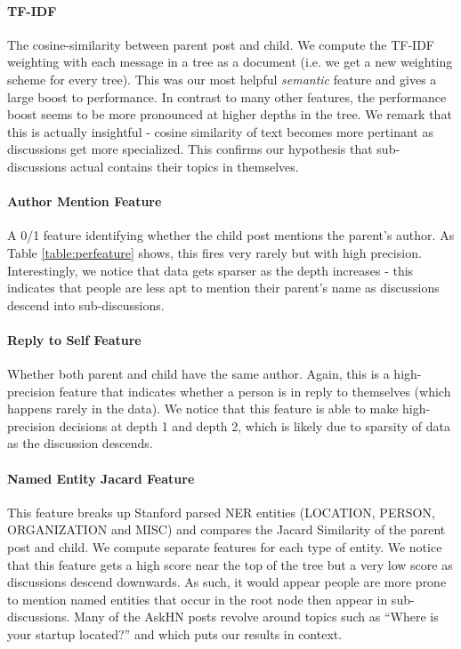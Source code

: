 \documentclass{article}
\begin{document}
\paragraph{TF-IDF} The cosine-similarity between parent post and child. We compute the 
TF-IDF weighting with each message in a tree as a document (i.e. we get a new weighting
scheme for every tree). This was our most helpful \textit{semantic} feature and
gives a large boost to performance. In contrast to many other
features, the performance boost seems to be more pronounced at higher depths in
the tree. We remark that this is actually insightful - cosine similarity of text
becomes more pertinant as discussions get more specialized. This confirms our
hypothesis that sub-discussions actual contains their topics in themselves.

\paragraph{Author Mention Feature} A 0/1 feature identifying whether the child 
post mentions the parent's author. As Table \ref{table:perfeature} shows, this
fires very rarely but with high precision. Interestingly, we notice that data gets
sparser as the depth increases - this indicates that people are less apt to 
mention their parent's name as discussions descend into sub-discussions.

\paragraph{Reply to Self Feature} Whether both parent and child have the same
author. Again, this is a high-precision feature that indicates whether a person
is in reply to themselves (which happens rarely in the data). We notice that
this feature is able to make high-precision decisions at depth 1 and depth 2,
which is likely due to sparsity of data as the discussion descends. 

\paragraph{Named Entity Jacard Feature} This feature breaks up Stanford parsed NER
entities (LOCATION, PERSON, ORGANIZATION and MISC) and compares the Jacard Similarity
of the parent post and child. We compute separate features for each type of entity.
We notice that this feature gets a high score near the top of the tree but a very low
score as  discussions descend downwards. As such, it would appear people are
more prone to mention named entities that occur in the root node then appear
in sub-discussions. Many of the AskHN posts revolve around topics such as
``Where is your startup located?'' and which puts our results in context.
\end{document}
